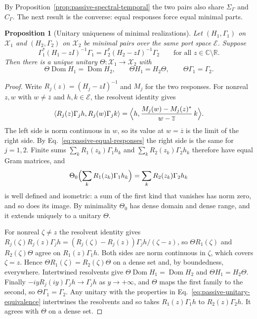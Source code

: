 \documentclass[11pt]{article}
\newtheorem{proposition}{Proposition}[section]
\theoremstyle{definition}
\newcommand{\C}{\mathbb C}
\newcommand{\R}{\mathbb R}
\begin{document}
By Proposition~\ref{prop:passive-spectral-temporal} the two pairs also share $\Sigma_\Gamma$ and $C_\Gamma$. The next result is the converse: equal responses force equal minimal parts.

\begin{proposition}[Unitary uniqueness of minimal realizations]
\label{prop:passive-uniqueness}
Let $(H_1,\Gamma_1)$ on $\mathcal X_1$ and $(H_2,\Gamma_2)$ on $\mathcal X_2$ be minimal pairs over the same port space $\mathcal E$. Suppose
\begin{equation}
 \Gamma_1^*(H_1-zI)^{-1}\Gamma_1=\Gamma_2^*(H_2-zI)^{-1}\Gamma_2
 \qquad\text{for all }z\in\C\setminus\R .
 \label{eq:passive-equal-responses}
\end{equation}
Then there is a unique unitary $\Theta:\mathcal X_1\to\mathcal X_2$ with
\begin{equation}
 \Theta\operatorname{Dom}H_1=\operatorname{Dom}H_2,\qquad \Theta H_1=H_2\Theta,\qquad \Theta\Gamma_1=\Gamma_2 .
 \label{eq:passive-unitary-equivalence}
\end{equation}
\end{proposition}
\begin{proof}
Write $R_j(z)=(H_j-zI)^{-1}$ and $M_j$ for the two responses. For nonreal $z,w$ with $w\ne\overline z$ and $h,k\in\mathcal E$, the resolvent identity gives
\begin{equation}
 \langle R_j(z)\Gamma_jh,R_j(w)\Gamma_jk\rangle
   =\Bigl\langle h,\frac{M_j(w)-M_j(z)^*}{w-\overline z}\,k\Bigr\rangle .
 \label{eq:passive-gram}
\end{equation}
The left side is norm continuous in $w$, so its value at $w=\overline z$ is the limit of the right side. By Eq.~\eqref{eq:passive-equal-responses} the right side is the same for $j=1,2$. Finite sums $\sum_kR_1(z_k)\Gamma_1h_k$ and $\sum_kR_2(z_k)\Gamma_2h_k$ therefore have equal Gram matrices, and
\[
 \Theta_0\Bigl(\sum_kR_1(z_k)\Gamma_1h_k\Bigr)=\sum_kR_2(z_k)\Gamma_2h_k
\]
is well defined and isometric: a sum of the first kind that vanishes has norm zero, and so does its image. By minimality $\Theta_0$ has dense domain and dense range, and it extends uniquely to a unitary $\Theta$.

For nonreal $\zeta\ne z$ the resolvent identity gives $R_j(\zeta)R_j(z)\Gamma_jh=(R_j(\zeta)-R_j(z))\Gamma_jh/(\zeta-z)$, so $\Theta R_1(\zeta)$ and $R_2(\zeta)\Theta$ agree on $R_1(z)\Gamma_1h$. Both sides are norm continuous in $\zeta$, which covers $\zeta=z$. Hence $\Theta R_1(\zeta)=R_2(\zeta)\Theta$ on a dense set and, by boundedness, everywhere. Intertwined resolvents give $\Theta\operatorname{Dom}H_1=\operatorname{Dom}H_2$ and $\Theta H_1=H_2\Theta$. Finally $-iyR_j(iy)\Gamma_jh\to\Gamma_jh$ as $y\to+\infty$, and $\Theta$ maps the first family to the second, so $\Theta\Gamma_1=\Gamma_2$. Any unitary with the properties in Eq.~\eqref{eq:passive-unitary-equivalence} intertwines the resolvents and so takes $R_1(z)\Gamma_1h$ to $R_2(z)\Gamma_2h$. It agrees with $\Theta$ on a dense set.
\end{proof}
\end{document}
